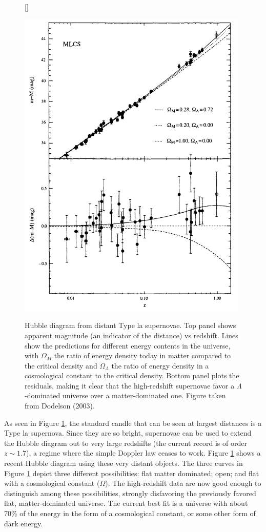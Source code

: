 \documentclass[a4paper,11pt]{article}
\begin{document}
\begin{figure}[h]
    [\FBwidth]
    {\caption{\footnotesize{Hubble diagram from distant Type la supernovae. Top panel shows apparent magnitude (an indicator of the distance) vs redshift. Lines show the predictions for different energy contents in the universe, with $\Omega_M$ the ratio of energy density today in matter compared to the critical density and $\Omega_\Lambda$ the ratio of energy density in a cosmological constant to the critical density. Bottom panel plots the residuals, making it clear that the high-redshift supernovae favor a $\Lambda$-dominated universe over a matter-dominated one. Figure taken from Dodelson (2003).}}
    \label{fig:hubblediagram_modern}}
    {\includegraphics[width=11cm]{figures/HubbleDiagram_modern.png}}
\end{figure}

{\noindent}As seen in Figure \ref{fig:hubblediagram_modern}, the standard candle that can be seen at largest distances is a Type la supernova. Since they are so bright, supernovae can be used to extend the Hubble diagram out to very large redshifts (the current record is of order $z\sim1.7$), a regime where the simple Doppler law ceases to work. Figure \ref{fig:hubblediagram_modern} shows a recent Hubble diagram using these very distant objects. The three curves in Figure \ref{fig:hubblediagram_modern} depict three different possibilities: flat matter dominated; open; and flat with a cosmological constant ($\Omega$). The high-redshift data are now good enough to distinguish among these possibilities, strongly disfavoring the previously favored flat, matter-dominated universe. The current best fit is a universe with about 70\% of the energy in the form of a cosmological constant, or some other form of dark energy.
\end{document}
